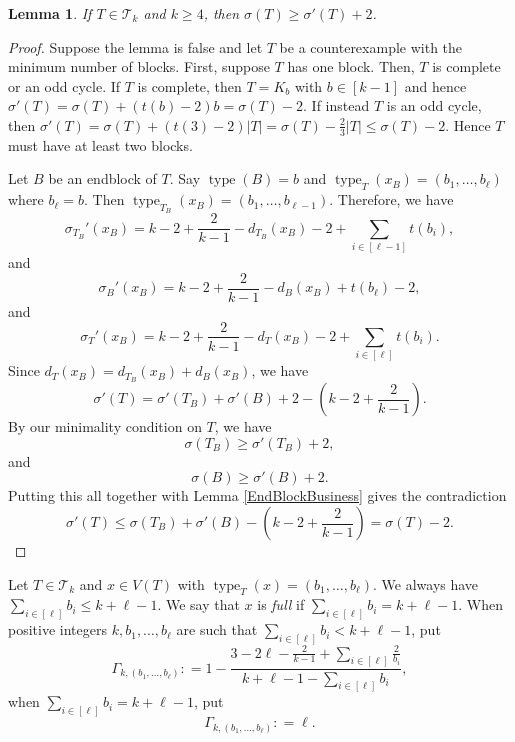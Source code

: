 \documentclass[12pt]{article}
\theoremstyle{plain}
\newtheorem{lem}[thm]{Lemma}
\theoremstyle{definition}
\theoremstyle{remark}
\newcommand{\fancy}[1]{\mathcal{#1}}
\newcommand{\T}{\fancy{T}}
\newcommand{\irange}[1]{\left[#1\right]}
\newcommand{\parens}[1]{\left( #1 \right)}
\newcommand{\DefinedAs}{\mathrel{\mathop:}=}
\newcommand{\type}{\operatorname{type}}
\begin{document}
\begin{lem}\label{SigmaPrimeIsTwoLess}
	If $T \in \T_k$ and $k \ge 4$, then  $\sigma(T) \ge \sigma'(T) + 2$.
\end{lem}
\begin{proof}
	Suppose the lemma is false and let $T$ be a counterexample with the minimum number of blocks.  First, suppose $T$ has one block.  Then, $T$ is complete or an odd cycle.  If $T$ is complete, then $T = K_b$ with $b \in \irange{k-1}$ and hence $\sigma'(T) = \sigma(T) + (t(b) - 2)b = \sigma(T) - 2$.  If instead $T$ is an odd cycle, then $\sigma'(T) = \sigma(T) + (t(3) - 2)|T| = \sigma(T) - \frac23|T| \le \sigma(T) - 2$.  Hence $T$ must have at least two blocks.
	
	Let $B$ be an endblock of $T$.  Say $\type(B) = b$ and $\type_T(x_B) = (b_1, \ldots, b_\ell)$ where $b_\ell = b$.  Then $\type_{T_B}(x_B) = (b_1, \ldots, b_{\ell - 1})$.  Therefore, we have
	\[\sigma_{T_B}'(x_B) = k - 2 + \frac{2}{k-1} - d_{T_B}(x_B) - 2 + \sum_{i \in \irange{\ell - 1}}t(b_i),\] and
	\[\sigma_{B}'(x_B) = k - 2 + \frac{2}{k-1} - d_{B}(x_B) + t(b_\ell) - 2,\] and
	\[\sigma_T'(x_B) = k - 2 + \frac{2}{k-1} - d_{T}(x_B) - 2 + \sum_{i \in \irange{\ell}}t(b_i).\]
	Since $d_T(x_B) = d_{T_B}(x_B) + d_B(x_B)$, we have
	\[\sigma'(T) = \sigma'(T_B) + \sigma'(B) + 2 - \parens{k - 2 + \frac{2}{k-1}}.\]
	By our minimality condition on $T$, we have
	\[\sigma(T_B) \ge \sigma'(T_B) + 2,\] and
	\[\sigma(B) \ge \sigma'(B) + 2.\]
	Putting this all together with Lemma \ref{EndBlockBusiness} gives the contradiction
	\[\sigma'(T) \le \sigma(T_B) + \sigma'(B) - \parens{k - 2 + \frac{2}{k-1}} = \sigma(T) - 2.\]
\end{proof}

Let $T \in \T_k$ and $x \in V(T)$ with $\type_T(x) = (b_1, \ldots, b_\ell)$.  We always have $\sum_{i \in \irange{\ell}} b_i \le k + \ell - 1$. We say that $x$ is \emph{full} if $\sum_{i \in \irange{\ell}} b_i = k + \ell - 1$.  When positive integers $k,b_1, \ldots, b_\ell$ are such that $\sum_{i \in \irange{\ell}} b_i < k + \ell - 1$, put 
\[\Gamma_{k,(b_1,\ldots,b_{\ell})} \DefinedAs 1 - \frac{3 - 2\ell - \frac{2}{k-1} + \sum_{i \in \irange{\ell}} \frac{2}{b_i}}{k + \ell - 1 - \sum_{i \in \irange{\ell}} b_i},\]
when $\sum_{i \in \irange{\ell}} b_i = k + \ell - 1$, put
\[\Gamma_{k,(b_1,\ldots,b_{\ell})} \DefinedAs \ell.\]
\end{document}
